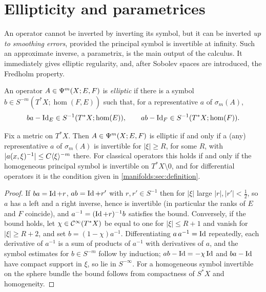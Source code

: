 \section{Ellipticity and parametrices}\label{manifolds:sec:elliptic}
An operator cannot be inverted by inverting its symbol, but it can be inverted
\emph{up to smoothing errors}, provided the principal symbol is invertible at
infinity. Such an approximate inverse, a parametrix, is the main output of the
calculus. It immediately gives elliptic regularity, and, after Sobolev spaces
are introduced, the Fredholm property.

\begin{definition}\label{manifolds:def:elliptic}
An operator $A\in\Psi^{m}(X;E,F)$ is \emph{elliptic} if there is a symbol
$b\in S^{-m}(T^*X;\hom(F,E))$ such that, for a representative $a$ of $\sigma_m(A)$,
\begin{equation*}
ba-\operatorname{Id}_E\in S^{-1}(T^*X;\hom(E)),\qquad ab-\operatorname{Id}_F\in S^{-1}(T^*X;\hom(F)).
\end{equation*}
\end{definition}

\begin{lemma}\label{manifolds:lem:elliptic}
Fix a metric on $T^*X$. Then $A\in\Psi^{m}(X;E,F)$ is elliptic if and only if a
(any) representative $a$ of $\sigma_m(A)$ is invertible for $|\xi|\ge R$, for some $R$,
with $|a(x,\xi)^{-1}|\le C\langle \xi\rangle^{-m}$ there. For classical operators this holds if
and only if the homogeneous principal symbol is invertible on $T^*X\setminus0$, and
for differential operators it is the condition given in
\cref{manifolds:sec:definition}.
\end{lemma}
\begin{proof}
If $ba=\operatorname{Id}+r$, $ab=\operatorname{Id}+r'$ with $r,r'\in S^{-1}$ then for $|\xi|$ large $|r|,|r'|<\frac12$,
so $a$ has a left and a right inverse, hence is invertible (in particular the
ranks of $E$ and $F$ coincide), and $a^{-1}=(\operatorname{Id}+r)^{-1}b$ satisfies the bound.
Conversely, if the bound holds, let $\chi\in\mathcal{C}^\infty(T^*X)$ be equal to one for $|\xi|\le R+1$ and
vanish for $|\xi|\ge R+2$, and set $b=(1-\chi)a^{-1}$. Differentiating
$a\,a^{-1}=\operatorname{Id}$ repeatedly, each derivative of $a^{-1}$ is a sum of products of
$a^{-1}$ with derivatives of $a$, and the symbol estimates for $b\in S^{-m}$
follow by induction; $ab-\operatorname{Id}=-\chi\operatorname{Id}$ and $ba-\operatorname{Id}$ have compact support in $\xi$, so
lie in $S^{-\infty}$. For a homogeneous symbol invertible on the sphere bundle the
bound follows from compactness of $S^*X$ and homogeneity.
\end{proof}

